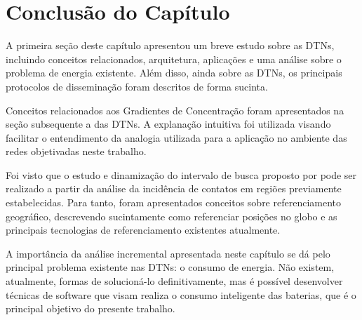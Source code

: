 \section{Conclusão do Capítulo}\label{sec:conclusao_cap_2}

A primeira seção deste capítulo apresentou um breve estudo sobre as DTNs, incluindo conceitos relacionados, arquitetura, aplicações e uma análise sobre o problema de energia existente. Além disso, ainda sobre as DTNs, os principais protocolos de disseminação foram descritos de forma sucinta.

Conceitos relacionados aos Gradientes de Concentração foram apresentados na seção subsequente a das DTNs. A explanação intuitiva foi utilizada visando facilitar o entendimento da analogia utilizada para a aplicação no ambiente das redes objetivadas neste trabalho.

Foi visto que o estudo e dinamização do intervalo de busca proposto por \newline \cite{denis_artigo} pode ser realizado a partir da análise da incidência de contatos em regiões previamente estabelecidas. Para tanto, foram apresentados conceitos sobre referenciamento geográfico, descrevendo sucintamente como referenciar posições no globo e as principais tecnologias de referenciamento existentes atualmente.

A importância da análise incremental apresentada neste capítulo se dá pelo principal problema existente nas DTNs: o consumo de energia. Não existem, atualmente, formas de solucioná-lo definitivamente, mas é possível desenvolver técnicas de software que visam realiza o consumo inteligente das baterias, que é o principal objetivo do presente trabalho.